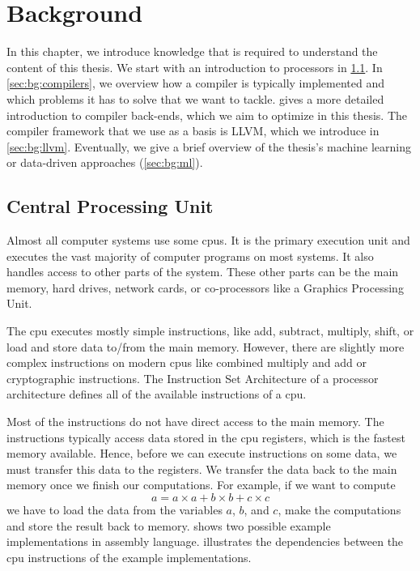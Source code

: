 \chapter{Background}
In this chapter, we introduce knowledge that is required to understand the content of this thesis.
We start with an introduction to processors in \cref{sec:bg:cpu}.
In \cref{sec:bg:compilers}, we overview how a compiler is typically implemented and which problems it has to solve that we want to tackle.
 gives a more detailed introduction to compiler back-ends, which we aim to optimize in this thesis.
The compiler framework that we use as a basis is LLVM, which we introduce in \cref{sec:bg:llvm}.
Eventually, we give a brief overview of the thesis's machine learning or data-driven approaches (\cref{sec:bg:ml}).


% 

\section{Central Processing Unit}
\label{sec:bg:cpu}
Almost all computer systems use some \acp{cpu}.
It is the primary execution unit and executes the vast majority of computer programs on most systems.
It also handles access to other parts of the system.
These other parts can be the main memory, hard drives, network cards, or co-processors like a Graphics Processing Unit.

The \ac{cpu} executes mostly simple instructions, like add, subtract, multiply, shift, or load and store data to/from the main memory.
However, there are slightly more complex instructions on modern \acp{cpu} like combined multiply and add or cryptographic instructions.
The Instruction Set Architecture of a processor architecture defines all of the available instructions of a \ac{cpu}.

Most of the instructions do not have direct access to the main memory.
The instructions typically access data stored in the \ac{cpu} registers, which is the fastest memory available.
Hence, before we can execute instructions on some data, we must transfer this data to the registers.
We transfer the data back to the main memory once we finish our computations.
For example, if we want to compute 
\begin{equation}
    a=a\times a+b\times b+c\times c
    \label{eqn:bg:abc}
\end{equation}
we have to load the data from the variables $a$, $b$, and $c$, make the computations and store the result back to memory.
 shows two possible example implementations in assembly language.
 illustrates the dependencies between the \ac{cpu} instructions of the example implementations.

